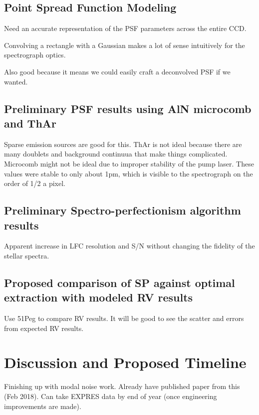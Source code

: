 \documentclass[11pt]{article}
\begin{document}
\subsection{Point Spread Function Modeling}

Need an accurate representation of the PSF parameters across the entire CCD.

Convolving a rectangle with a Gaussian makes a lot of sense intuitively for the spectrograph optics.

Also good because it means we could easily craft a deconvolved PSF if we wanted.

\subsection{Preliminary PSF results using AlN microcomb and ThAr}

Sparse emission sources are good for this. ThAr is not ideal because there are many doublets and background continuua that make things complicated. Microcomb might not be ideal due to improper stability of the pump laser. These values were stable to only about 1pm, which is visible to the spectrograph on the order of 1/2 a pixel.

\subsection{Preliminary Spectro-perfectionism algorithm results}

Apparent increase in LFC resolution and S/N without changing the fidelity of the stellar spectra.

\subsection{Proposed comparison of SP against optimal extraction with modeled RV results}

Use 51Peg to compare RV results. It will be good to see the scatter and errors from expected RV results.

\section{Discussion and Proposed Timeline}

Finishing up with modal noise work. Already have published paper from this (Feb 2018). Can take EXPRES data by end of year (once engineering improvements are made).



\pagebreak



\end{document}
